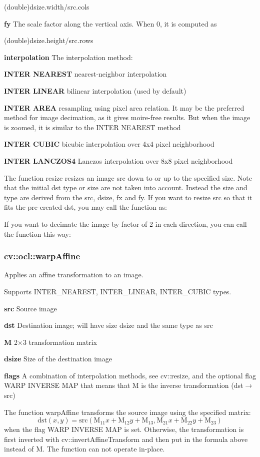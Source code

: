 \documentclass{article}
\begin{document}
(double)dsize.width/src.cols

\textbf{fy }The scale factor along the vertical axis. When 0, it is computed
as

(double)dsize.height/src.rows

\textbf{interpolation }The interpolation method:

\textbf{INTER NEAREST }nearest-neighbor interpolation

\textbf{INTER LINEAR }bilinear interpolation (used by default)

\textbf{INTER AREA }resampling using pixel area relation. It may be the
preferred method for image decimation, as it gives moire-free results. But
when the image is zoomed, it is similar to the INTER NEAREST method

\textbf{INTER CUBIC }bicubic interpolation over 4x4 pixel neighborhood

\textbf{INTER LANCZOS4 }Lanczos interpolation over 8x8 pixel neighborhood

The function resize resizes an image src down to or up to the specified
size. Note that the initial dst type or size are not taken into account.
Instead the size and type are derived from the src, dsize, fx and fy. If you
want to resize src so that it fits the pre-created dst, you may call the
function as:

If you want to decimate the image by factor of 2 in each direction, you can
call the function this way:

\newpage

\subsubsection{cv::ocl::warpAffine }
\label{subsubsec:mylabel46}
Applies an affine transformation to an image.

Supports INTER{\_}NEAREST, INTER{\_}LINEAR, INTER{\_}CUBIC types.

\textbf{src }Source image

\textbf{dst }Destination image; will have size dsize and the same type as
src

\textbf{M }2$\times $3 transformation matrix

\textbf{dsize }Size of the destination image

\textbf{flags }A combination of interpolation methods, see cv::resize, and
the optional flag WARP INVERSE MAP that means that M is the inverse
transformation (dst$\to $src)

The function warpAffine transforms the source image using the specified
matrix:
\[
\mbox{dst}(x,y)=\mbox{src}(\mbox{M}_{11} x+\mbox{M}_{12} y+\mbox{M}_{13}
,\mbox{M}_{21} x+\mbox{M}_{22} y+\mbox{M}_{23} )
\]
when the flag WARP INVERSE MAP is set. Otherwise, the transformation is
first inverted with cv::invertAffineTransform and then put in the formula
above instead of M. The function can not operate in-place.
\end{document}

